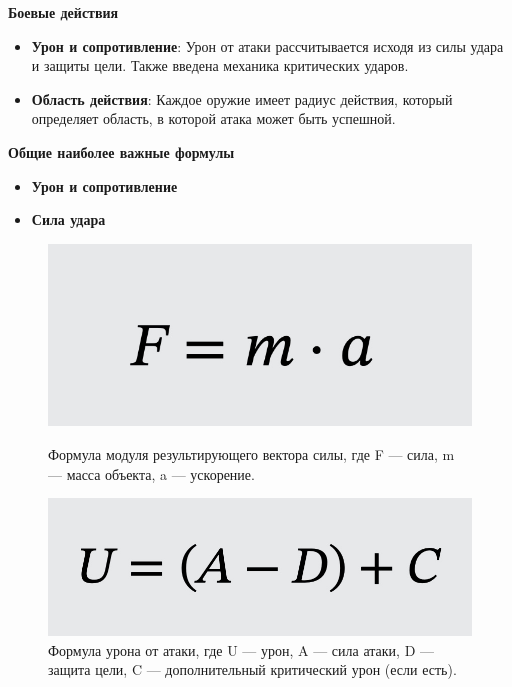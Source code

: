 \documentclass{article}
\begin{document}
	\textbf{Боевые действия}
	
	\begin{itemize}
		\item \textbf{Урон и сопротивление}: Урон от атаки рассчитывается исходя из силы удара и защиты цели. Также введена механика критических ударов.
		\item \textbf{Область действия}: Каждое оружие имеет радиус действия, который определяет область, в которой атака может быть успешной.
	\end{itemize}
	
	\textbf{Общие наиболее важные формулы}
	
	\begin{itemize}
		\item \textbf{Урон и сопротивление}
		\item \textbf{Сила удара}
	\end{itemize}
	
	\begin{figure}[h]
		\centering
		\begin{minipage}{0.45\textwidth}
			\centering
			\includegraphics[width=\textwidth]{images/formula2.jpg}
			\caption{Формула модуля результирующего вектора силы, где F — сила, m — масса объекта, a — ускорение.}
			\label{fig:form2}
		\end{minipage}
		\hfill
		\begin{minipage}{0.45\textwidth}
			\centering
			\includegraphics[width=\textwidth]{images/formula1.jpg}
			\caption{Формула урона от атаки, где U — урон, A — сила атаки, D — защита цели, C — дополнительный критический урон (если есть).}
			\label{fig:form1}
		\end{minipage}
	\end{figure}
	
\end{document}
